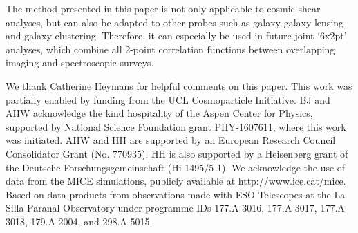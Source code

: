 \documentclass{aa}
\begin{document}
The method presented in this paper is not only applicable to cosmic shear analyses, but can also be adapted to other probes such as galaxy-galaxy lensing and galaxy clustering. Therefore, it can especially be used in future joint `6x2pt' analyses, which combine all 2-point correlation functions between overlapping imaging and spectroscopic surveys.
\begin{acknowledgements}
We thank Catherine Heymans for helpful comments on this paper.
This work was partially enabled by funding from the UCL Cosmoparticle Initiative.
BJ and AHW acknowledge the kind hospitality of the Aspen Center for Physics, supported by National Science Foundation grant PHY-1607611, where this work was initiated.
AHW and HH are supported by an European Research Council Consolidator Grant (No. 770935).
HH is also supported by a Heisenberg grant of the Deutsche Forschungsgemeinschaft (Hi 1495/5-1). 
We acknowledge the use of data from the MICE simulations, publicly available at http://www.ice.cat/mice.
Based on data products from observations made with ESO Telescopes at the La Silla Paranal Observatory under programme IDs 177.A-3016, 177.A-3017, 177.A-3018, 179.A-2004, and 298.A-5015.
\end{acknowledgements}



\end{document}

